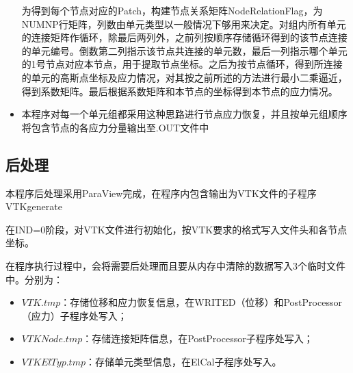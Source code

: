 \documentclass[UTF8]{ctexbook}
\begin{document}
\begin{itemize}
为得到每个节点对应的Patch，构建节点关系矩阵NodeRelationFlag，为NUMNP行矩阵，列数由单元类型以一般情况下够用来决定。对组内所有单元的连接矩阵作循环，除最后两列外，之前列按顺序存储循环得到的该节点连接的单元编号。倒数第二列指示该节点共连接的单元数，最后一列指示哪个单元的1号节点对应本节点，用于提取节点坐标。之后为按节点循环，得到所连接的单元的高斯点坐标及应力情况，对其按之前所述的方法进行最小二乘逼近，得到系数矩阵。最后根据系数矩阵和本节点的坐标得到本节点的应力情况。

\item 本程序对每一个单元组都采用这种思路进行节点应力恢复，并且按单元组顺序将包含节点的各应力分量输出至.OUT文件中
\end{itemize}

\subsection{后处理}
本程序后处理采用ParaView完成，在程序内包含输出为VTK文件的子程序VTKgenerate

在IND=0阶段，对VTK文件进行初始化，按VTK要求的格式写入文件头和各节点坐标。

在程序执行过程中，会将需要后处理而且要从内存中清除的数据写入3个临时文件中。分别为：

\begin{itemize}
\item $VTK.tmp$：存储位移和应力恢复信息，在WRITED（位移）和PostProcessor（应力）子程序处写入；
\item $VTKNode.tmp$：存储连接矩阵信息，在PostProcessor子程序处写入；
\item $VTKElTyp.tmp$：存储单元类型信息，在ElCal子程序处写入。
\end{itemize}
\end{document}
